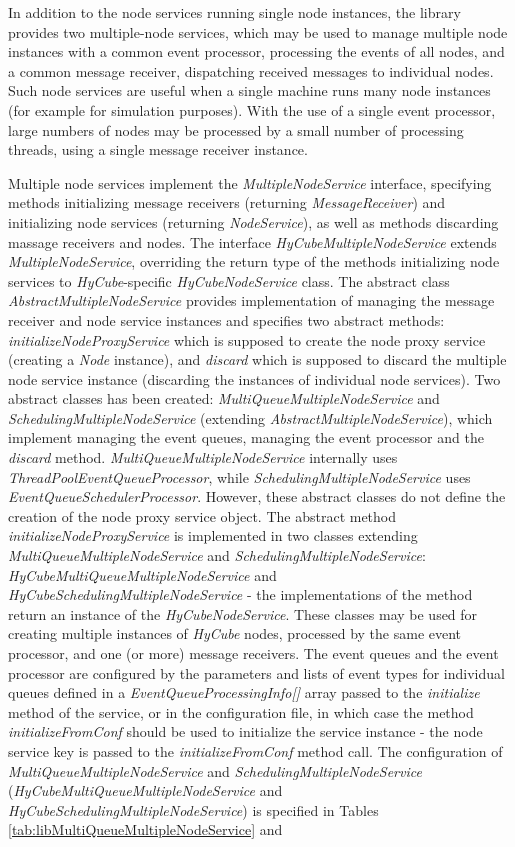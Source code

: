 In addition to the node services running single node instances, the library provides two multiple-node services, which may be used to manage multiple node instances with a common event processor, processing the events of all nodes, and a common message receiver, dispatching received messages to individual nodes. Such node services are useful when a single machine runs many node instances (for example for simulation purposes). With the use of a single event processor, large numbers of nodes may be processed by a small number of processing threads, using a single message receiver instance.

Multiple node services implement the \emph{MultipleNodeService} interface, specifying methods initializing message receivers (returning \emph{MessageReceiver}) and initializing node services (returning \emph{NodeService}), as well as methods discarding massage receivers and nodes. The interface \emph{HyCubeMultipleNodeService} extends \emph{MultipleNodeService}, overriding the return type of the methods initializing node services to \emph{HyCube}-specific \emph{HyCubeNodeService} class. The abstract class \emph{AbstractMultipleNodeService} provides implementation of managing the message receiver and node service instances and specifies two abstract methods: \emph{initializeNodeProxyService} which is supposed to create the node proxy service (creating a \emph{Node} instance), and \emph{discard} which is supposed to discard the multiple node service instance (discarding the instances of individual node services). Two abstract classes has been created: \emph{MultiQueueMultipleNodeService} and \emph{SchedulingMultipleNodeService} (extending \emph{AbstractMultipleNodeService}), which implement managing the event queues, managing the event processor and the \emph{discard} method. \emph{MultiQueueMultipleNodeService} internally uses \emph{ThreadPoolEventQueueProcessor}, while \emph{SchedulingMultipleNodeService} uses \emph{EventQueueSchedulerProcessor}. However, these abstract classes do not define the creation of the node proxy service object. The abstract method \emph{initializeNodeProxyService} is implemented in two classes extending \emph{MultiQueueMultipleNodeService} and \emph{SchedulingMultipleNodeService}: \emph{HyCubeMultiQueueMultipleNodeService} and \emph{HyCubeSchedulingMultipleNodeService} - the implementations of the method return an instance of the \emph{HyCubeNodeService}. These classes may be used for creating multiple instances of \emph{HyCube} nodes, processed by the same event processor, and one (or more) message receivers. The event queues and the event processor are configured by the parameters and lists of event types for individual queues defined in a \emph{EventQueueProcessingInfo[]} array passed to the \emph{initialize} method of the service, or in the configuration file, in which case the method \emph{initializeFromConf} should be used to initialize the service instance - the node service key is passed to the \emph{initializeFromConf} method call. The configuration of \emph{MultiQueueMultipleNodeService} and \emph{SchedulingMultipleNodeService} (\emph{HyCubeMultiQueueMultipleNodeService} and \emph{HyCubeSchedulingMultipleNodeService}) is specified in Tables \ref{tab:libMultiQueueMultipleNodeService} and 